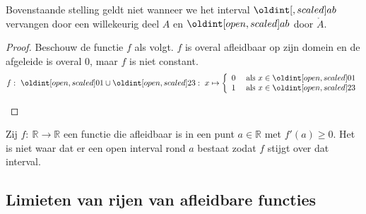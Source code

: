 \documentclass[main.tex]{subfiles}
\begin{document}
\begin{tvb}
  Bovenstaande stelling geldt niet wanneer we het interval $\interval{a}{b}$ vervangen door een willekeurig deel $A$ en $\interval[open]{a}{b}$ door $\mathring{A}$.
  \begin{proof}
    Beschouw de functie $f$ als volgt. $f$ is overal afleidbaar op zijn domein en de afgeleide is overal $0$, maar $f$ is niet constant.
    \[
    f:\ \interval[open]{0}{1}\cup \interval[open]{2}{3}:\ x \mapsto
    \left\{
      \begin{array}{rl}
        0 & \text{ als } x \in \interval[open]{0}{1}\\
        1 & \text{ als } x \in \interval[open]{2}{3}
      \end{array}
    \right.
    \]
    \begin{figure}[H]
      \centering
    \end{figure}
  \end{proof}
\end{tvb}

\begin{gst}
  Zij $f:\ \mathbb{R} \rightarrow \mathbb{R}$ een functie die afleidbaar is in een punt $a\in \mathbb{R}$ met $f'(a) \ge 0$.
  Het is niet waar dat er een open interval rond $a$ bestaat zodat $f$ stijgt over dat interval.
\end{gst}


\subsection{Limieten van rijen van afleidbare functies}
\label{sec:limieten-van-rijen}
\end{document}
